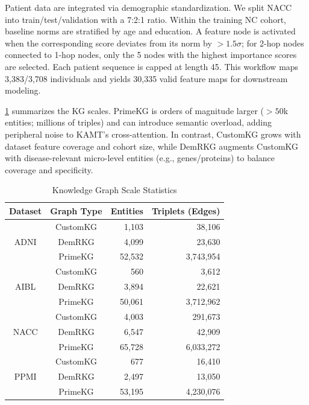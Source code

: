 \documentclass[lettersize,journal]{IEEEtran}
\begin{document}
    Patient data are integrated via demographic standardization. We split NACC into train/test/validation with a 7:2:1 ratio. Within the training NC cohort, baseline norms are stratified by age and education. A feature node is activated when the corresponding score deviates from its norm by $>1.5\sigma$; for 2-hop nodes connected to 1-hop nodes, only the 5 nodes with the highest importance scores are selected. Each patient sequence is capped at length 45. This workflow maps 3,383/3,708 individuals and yields 30,335 valid feature maps for downstream modeling.

    
    \cref{tab:kg_statistics} summarizes the KG scales. PrimeKG is orders of magnitude larger ($>50$k entities; millions of triples) and can introduce semantic overload, adding peripheral noise to KAMT's cross-attention. In contrast, CustomKG grows with dataset feature coverage and cohort size, while DemRKG augments CustomKG with disease-relevant micro-level entities (e.g., genes/proteins) to balance coverage and specificity.
    \begin{table}[!t]
    \centering
    \caption{Knowledge Graph Scale Statistics}
    \label{tab:kg_statistics}
    \setlength{\tabcolsep}{8pt}
    \renewcommand{\arraystretch}{1.15}
    \begin{tabular}{c c r r}
    \hline
    \textbf{Dataset} & \textbf{Graph Type} & \textbf{Entities} & \textbf{Triplets (Edges)} \\
    \hline
    \multirow{3}{*}{ADNI} & CustomKG & 1,103  & 38,106 \\
                        & DemRKG   & 4,099  & 23,630 \\
                        & PrimeKG  & 52,532 & 3,743,954 \\
    \hline
    \multirow{3}{*}{AIBL} & CustomKG & 560    & 3,612 \\
                        & DemRKG   & 3,894  & 22,621 \\
                        & PrimeKG  & 50,061 & 3,712,962 \\
    \hline
    \multirow{3}{*}{NACC} & CustomKG & 4,003  & 291,673 \\
                        & DemRKG   & 6,547  & 42,909 \\
                        & PrimeKG  & 65,728 & 6,033,272 \\
    \hline
    \multirow{3}{*}{PPMI} & CustomKG & 677    & 16,410 \\
                        & DemRKG   & 2,497  & 13,050 \\
                        & PrimeKG  & 53,195 & 4,230,076 \\
    \hline
    \end{tabular}
    \end{table}
\end{document}
